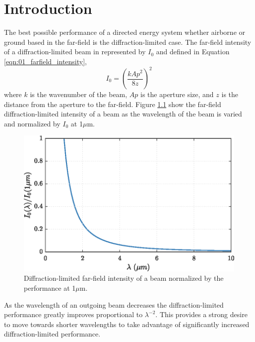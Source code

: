 \chapter{Introduction}
The best possible performance of a directed energy system whether airborne or ground based in the far-field is the diffraction-limited case.
The far-field intensity of a diffraction-limited beam in represented by $I_0$ and defined in Equation \ref{eqn:01_farfield_intensity},
\begin{equation}
  I_0 = \left(\frac{kAp^2}{8z}\right)^2
  \label{eqn:01_farfield_intensity}
\end{equation}
where $k$ is the wavenumber of the beam, $Ap$ is the aperture size, and $z$ is the distance from the aperture to the far-field.
Figure \ref{fig:01_farfield_intensity} show the far-field diffraction-limited intensity of a beam as the wavelength of the beam is varied and normalized by $I_0$ at 1$\mu$m.
\begin{figure}
  \centering
  \includegraphics{../matlab/01_introduction/farfield_intensity.eps}
  \caption{Diffraction-limited far-field intensity of a beam normalized by the performance at 1$\mu$m.}
  \label{fig:01_farfield_intensity}
\end{figure}
As the wavelength of an outgoing beam decreases the diffraction-limited performance greatly improves proportional to $\lambda^{-2}$.
This provides a strong desire to move towards shorter wavelengths to take advantage of significantly increased diffraction-limited performance.

